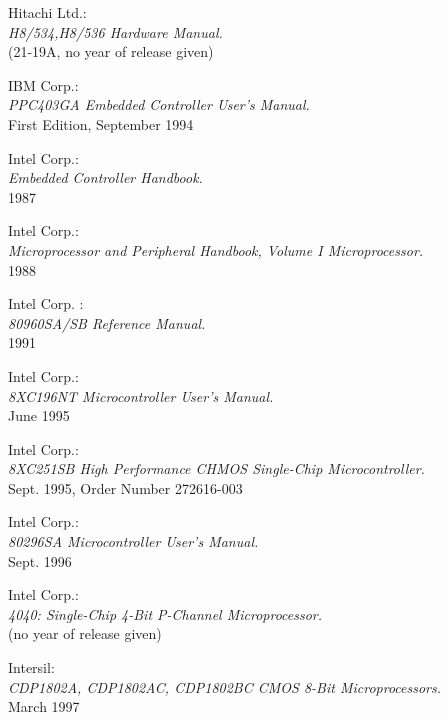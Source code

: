 \documentclass[12pt,twoside]{report}
\begin{document}
\begin{thebibliography}{99}
 Hitachi Ltd.: \\
                    {\em H8/534,H8/536 Hardware Manual.\/} \\
		    (21-19A, no year of release given)

 IBM Corp.: \\
	         {\em PPC403GA Embedded Controller User's Manual.\/} \\
                 First Edition, September 1994

 Intel Corp.: \\
                 {\em Embedded Controller Handbook.\/} \\
		 1987

 Intel Corp.: \\
                 {\em Microprocessor and Peripheral Handbook, Volume I
                 Microprocessor.\/} \\
                 1988

 Intel Corp. : \\
                 {\em 80960SA/SB Reference Manual.\/} \\
                 1991

 Intel Corp.: \\
                 {\em 8XC196NT Microcontroller User's Manual.\/} \\
                 June 1995

 Intel Corp.: \\
                 {\em 8XC251SB High Performance CHMOS Single-Chip
                  Microcontroller.\/} \\
                 Sept. 1995, Order Number 272616-003

 Intel Corp.: \\
                 {\em 80296SA Microcontroller User's Manual.\/} \\
                 Sept. 1996

 Intel Corp.: \\
                  {\em 4040: Single-Chip 4-Bit P-Channel
                   Microprocessor.\/} \\
                  (no year of release given)

 Intersil: \\
                 {\em CDP1802A, CDP1802AC, CDP1802BC CMOS 8-Bit
                  Microprocessors.\/} \\
                 March 1997


\end{thebibliography}
\end{document}
